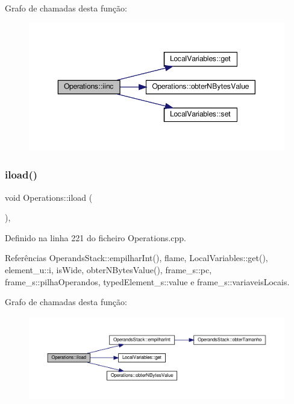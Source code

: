 Grafo de chamadas desta função\+:
\nopagebreak
\begin{figure}[H]
\begin{center}
\leavevmode
\includegraphics[width=350pt]{classOperations_a9934f9369192b10a978c7d6950592c42_cgraph}
\end{center}
\end{figure}
\mbox{\label{classOperations_a84e70afc25fa4e54a7e2bffae742222a}} 
\subsubsection{\texorpdfstring{iload()}{iload()}}
{\footnotesize\ttfamily void Operations\+::iload (\begin{DoxyParamCaption}{ }\end{DoxyParamCaption})\hspace{0.3cm}{\ttfamily [static]}, {\ttfamily [private]}}



Definido na linha 221 do ficheiro Operations.\+cpp.



Referências Operands\+Stack\+::empilhar\+Int(), flame, Local\+Variables\+::get(), element\+\_\+u\+::i, is\+Wide, obter\+N\+Bytes\+Value(), frame\+\_\+s\+::pc, frame\+\_\+s\+::pilha\+Operandos, typed\+Element\+\_\+s\+::value e frame\+\_\+s\+::variaveis\+Locais.

Grafo de chamadas desta função\+:
\nopagebreak
\begin{figure}[H]
\begin{center}
\leavevmode
\includegraphics[width=350pt]{classOperations_a84e70afc25fa4e54a7e2bffae742222a_cgraph}
\end{center}
\end{figure}
\mbox{\label{classOperations_a3aba059cf78681767c141d27989fc2aa}} 
